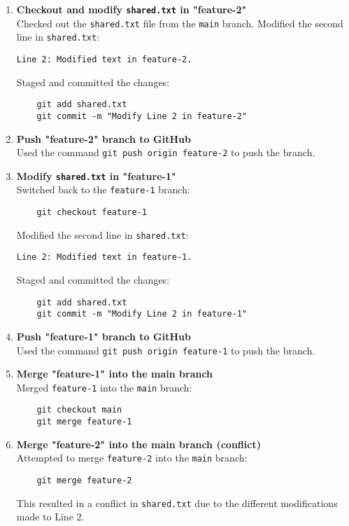 \documentclass{article}
\begin{document}
\begin{enumerate}
    \item \textbf{Checkout and modify \texttt{shared.txt} in "feature-2"}\\
    Checked out the \texttt{shared.txt} file from the \texttt{main} branch. Modified the second line in \texttt{shared.txt}:
    \begin{lstlisting}[language={}]
    Line 2: Modified text in feature-2.
    \end{lstlisting}
    Staged and committed the changes:
    \begin{lstlisting}
    git add shared.txt
    git commit -m "Modify Line 2 in feature-2"
    \end{lstlisting}

    \item \textbf{Push "feature-2" branch to GitHub}\\
    Used the command \texttt{git push origin feature-2} to push the branch.

    \item \textbf{Modify \texttt{shared.txt} in "feature-1"}\\
    Switched back to the \texttt{feature-1} branch:
    \begin{lstlisting}
    git checkout feature-1
    \end{lstlisting}
    Modified the second line in \texttt{shared.txt}:
    \begin{lstlisting}[language={}]
    Line 2: Modified text in feature-1.
    \end{lstlisting}
    Staged and committed the changes:
    \begin{lstlisting}
    git add shared.txt
    git commit -m "Modify Line 2 in feature-1"
    \end{lstlisting}

    \item \textbf{Push "feature-1" branch to GitHub}\\
    Used the command \texttt{git push origin feature-1} to push the branch.

    \item \textbf{Merge "feature-1" into the main branch}\\
    Merged \texttt{feature-1} into the \texttt{main} branch:
    \begin{lstlisting}
    git checkout main
    git merge feature-1
    \end{lstlisting}

    \item \textbf{Merge "feature-2" into the main branch (conflict)}\\
    Attempted to merge \texttt{feature-2} into the \texttt{main} branch:
    \begin{lstlisting}
    git merge feature-2
    \end{lstlisting}
    This resulted in a conflict in \texttt{shared.txt} due to the different modifications made to Line 2.


\end{enumerate}
\end{document}
